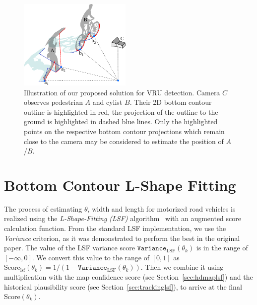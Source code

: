 \begin{figure}[htb]
    \centering
    \includegraphics[width=0.8\linewidth]{figures/vru-detection}
    \caption{Illustration of our proposed solution for VRU detection. Camera $C$ observes pedestrian $A$ and cylist $B$. Their 2D bottom contour outline is highlighted in red, the projection of the outline to the ground is highlighted in dashed blue lines. Only the highlighted points on the respective bottom contour projections which remain close to the camera may be considered to estimate the position of $A$/$B$.}
    \label{fig:mono3d-vru}
\end{figure}

\section{Bottom Contour L-Shape Fitting}
\label{sec:botcontlsf}

The process of estimating $\theta$, width and length for motorized road vehicles is realized using the \textit{L-Shape-Fitting (LSF)} algorithm~\cite{zhang2017efficient} with an augmented score calculation function.
From the standard LSF implementation, we use the \textit{Variance} criterion, as it was demonstrated to perform the best in the original paper.
The value of the LSF variance score $\mathtt{Variance}_{\text{LSF}}(\theta_k)$ is in the range of $[-\infty, 0]$.
We convert this value to the range of $[0, 1]$ as $\text{Score}_\text{lsf}(\theta_k)=1 / (1 - \mathtt{Variance}_{\text{LSF}}(\theta_k))$.
Then we combine it using multiplication with the map confidence score (see Section~{\ref{sec:hdmaplsf}}) and the historical plausibility score (see Section~{\ref{sec:trackinglsf}}), to arrive at the final  $\text{Score}(\theta_k)$.

